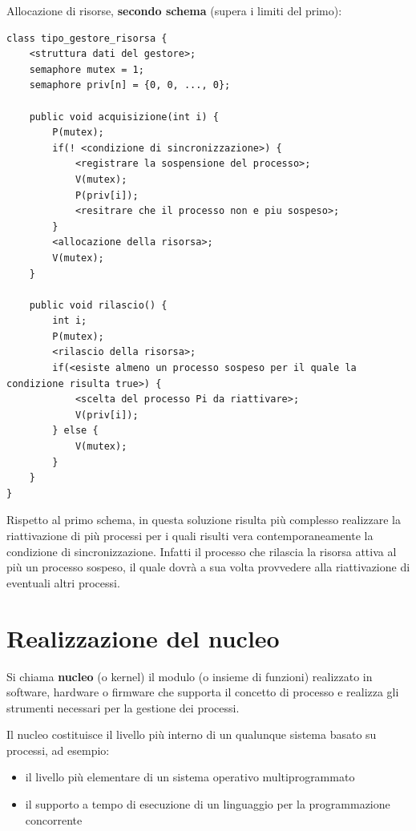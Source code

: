 \documentclass{article}
\begin{document}
\vspace{3mm}
Allocazione di risorse, \textbf{secondo schema} (supera i limiti del primo):

\begin{lstlisting}
class tipo_gestore_risorsa {
    <struttura dati del gestore>;
    semaphore mutex = 1;
    semaphore priv[n] = {0, 0, ..., 0};

    public void acquisizione(int i) {
        P(mutex);
        if(! <condizione di sincronizzazione>) {
            <registrare la sospensione del processo>;
            V(mutex);
            P(priv[i]);
            <resitrare che il processo non e piu sospeso>;
        }
        <allocazione della risorsa>;
        V(mutex);
    }

    public void rilascio() {
        int i;
        P(mutex);
        <rilascio della risorsa>;
        if(<esiste almeno un processo sospeso per il quale la condizione risulta true>) {
            <scelta del processo Pi da riattivare>;
            V(priv[i]);
        } else {
            V(mutex);
        }
    }
}
\end{lstlisting}

\vspace{3mm}
Rispetto al primo schema, in questa soluzione risulta più complesso realizzare la riattivazione di più processi per i quali risulti vera contemporaneamente la
condizione di sincronizzazione. Infatti il processo che rilascia la risorsa attiva al più un processo sospeso, il quale dovrà a sua volta provvedere alla riattivazione
di eventuali altri processi.

\newpage

\section{Realizzazione del nucleo}

Si chiama \textbf{nucleo} (o kernel) il modulo (o insieme di funzioni) realizzato in software, hardware o firmware che supporta il concetto di processo e realizza
gli strumenti necessari per la gestione dei processi.

\vspace{3mm}
Il nucleo costituisce il livello più interno di un qualunque sistema basato su processi, ad esempio:
\begin{itemize}
    \item il livello più elementare di un sistema operativo multiprogrammato
    \item il supporto a tempo di esecuzione di un linguaggio per la programmazione concorrente
\end{itemize}
\end{document}
